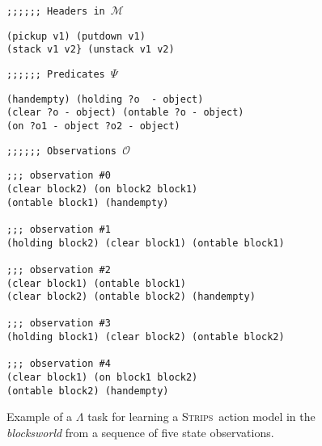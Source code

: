 \documentclass{article}
\newcommand{\strips}{\textsc{Strips}}     %
\begin{document}
\begin{figure}
{\footnotesize\tt ;;;;;; Headers in $\mathcal{M}$}
\begin{footnotesize}
\begin{verbatim}
(pickup v1) (putdown v1)
(stack v1 v2} (unstack v1 v2)
\end{verbatim}
\end{footnotesize}
\vspace{0.2cm}
{\footnotesize\tt ;;;;;; Predicates $\Psi$}
\begin{footnotesize}
\begin{verbatim}
(handempty) (holding ?o  - object)
(clear ?o - object) (ontable ?o - object)
(on ?o1 - object ?o2 - object)
\end{verbatim}
\end{footnotesize}
\vspace{0.2cm}
{\footnotesize\tt ;;;;;; Observations $\mathcal{O}$}
\begin{footnotesize}
\begin{verbatim}
;;; observation #0
(clear block2) (on block2 block1)
(ontable block1) (handempty)

;;; observation #1
(holding block2) (clear block1) (ontable block1)

;;; observation #2
(clear block1) (ontable block1)
(clear block2) (ontable block2) (handempty)

;;; observation #3
(holding block1) (clear block2) (ontable block2)

;;; observation #4
(clear block1) (on block1 block2)
(ontable block2) (handempty)
\end{verbatim}
\end{footnotesize}
 \caption{\small Example of a $\Lambda$ task for learning a \strips\ action model in the {\em blocksworld} from a sequence of five state observations.}
\label{fig:lexample}
\end{figure}
\end{document}
